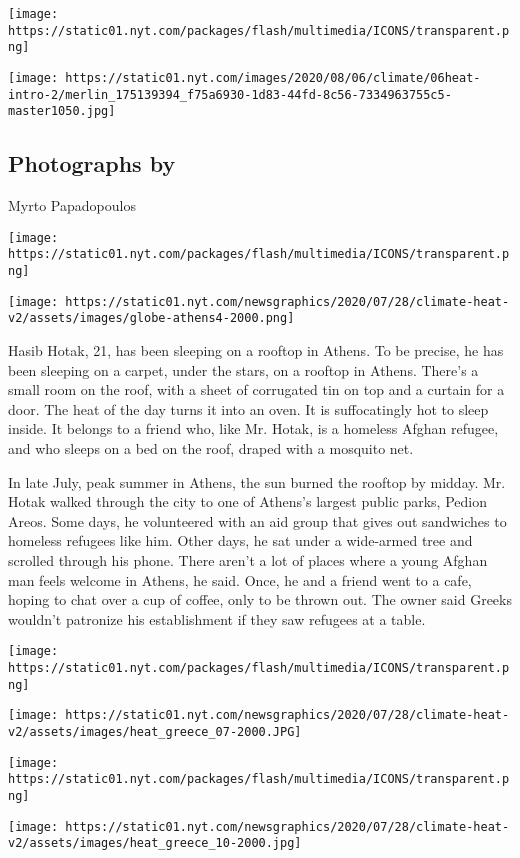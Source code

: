 \texttt{[image: https://static01.nyt.com/packages/flash/multimedia/ICONS/transparent.png]}

\texttt{[image: https://static01.nyt.com/images/2020/08/06/climate/06heat-intro-2/merlin\_175139394\_f75a6930-1d83-44fd-8c56-7334963755c5-master1050.jpg]}

\hypertarget{photographs-by}{%
\subsection{Photographs by}\label{photographs-by}}

Myrto Papadopoulos

\texttt{[image: https://static01.nyt.com/packages/flash/multimedia/ICONS/transparent.png]}

\texttt{[image: https://static01.nyt.com/newsgraphics/2020/07/28/climate-heat-v2/assets/images/globe-athens4-2000.png]}

Hasib Hotak, 21, has been sleeping on a rooftop in Athens. To be
precise, he has been sleeping on a carpet, under the stars, on a rooftop
in Athens. There's a small room on the roof, with a sheet of corrugated
tin on top and a curtain for a door. The heat of the day turns it into
an oven. It is suffocatingly hot to sleep inside. It belongs to a friend
who, like Mr. Hotak, is a homeless Afghan refugee, and who sleeps on a
bed on the roof, draped with a mosquito net.

In late July, peak summer in Athens, the sun burned the rooftop by
midday. Mr. Hotak walked through the city to one of Athens's largest
public parks, Pedion Areos. Some days, he volunteered with an aid group
that gives out sandwiches to homeless refugees like him. Other days, he
sat under a wide-armed tree and scrolled through his phone. There aren't
a lot of places where a young Afghan man feels welcome in Athens, he
said. Once, he and a friend went to a cafe, hoping to chat over a cup of
coffee, only to be thrown out. The owner said Greeks wouldn't patronize
his establishment if they saw refugees at a table.

\texttt{[image: https://static01.nyt.com/packages/flash/multimedia/ICONS/transparent.png]}

\texttt{[image: https://static01.nyt.com/newsgraphics/2020/07/28/climate-heat-v2/assets/images/heat\_greece\_07-2000.JPG]}

\texttt{[image: https://static01.nyt.com/packages/flash/multimedia/ICONS/transparent.png]}

\texttt{[image: https://static01.nyt.com/newsgraphics/2020/07/28/climate-heat-v2/assets/images/heat\_greece\_10-2000.jpg]}

